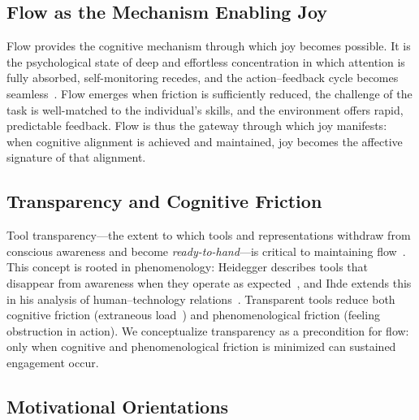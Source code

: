 \documentclass[12pt]{elsarticle}
\begin{document}
\subsection{Flow as the Mechanism Enabling Joy}

Flow provides the cognitive mechanism through which joy becomes 
possible. It is the psychological state of deep and effortless 
concentration in which attention is fully absorbed, self-monitoring 
recedes, and the action--feedback cycle becomes 
seamless~\cite{csikszentmihalyi1990}. Flow emerges when friction is 
sufficiently reduced, the challenge of the task is well-matched to the 
individual's skills, and the environment offers rapid, predictable 
feedback. Flow is thus the gateway through which joy manifests: when 
cognitive alignment is achieved and maintained, joy becomes the affective 
signature of that alignment.

\subsection{Transparency and Cognitive Friction}

Tool transparency---the extent to which tools and representations 
withdraw from conscious awareness and become \emph{ready-to-hand}---is 
critical to maintaining flow~\cite{kramer2007}. This concept is rooted in 
phenomenology: Heidegger describes tools that disappear from awareness 
when they operate as expected~\cite{heidegger1962}, and Ihde extends this 
in his analysis of human--technology relations~\cite{ihde1990}. 
Transparent tools reduce both cognitive friction (extraneous 
load~\cite{sweller1988}) and phenomenological friction (feeling 
obstruction in action). We conceptualize transparency as a precondition 
for flow: only when cognitive and phenomenological friction is minimized 
can sustained engagement occur.

\subsection{Motivational Orientations}
\label{sec:motivational-dimensions}
\end{document}
